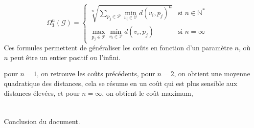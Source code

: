 \documentclass[12pt,a4paper]{article}
\begin{document}
\begin{equation*}
    \Omega_3^n(\mathcal{G}) = \begin{cases} 
        \sqrt[n]{\sum_{p_j \in \mathcal{P}} \min_{v_i \in \mathcal{V}} d(v_i, p_j)^n } & \text{si } n \in \mathbb{N}^*\\
        \max_{p_j \in \mathcal{P}} \min_{v_i \in \mathcal{V}} d(v_i, p_j) & \text{si } n = \infty
    \end{cases}
\end{equation*}
Ces formules permettent de généraliser les coûts en fonction d'un paramètre $n$,
où $n$ peut être un entier positif ou l'infini.

pour $n=1$, on retrouve les coûts précédents,
pour $n=2$, on obtient une moyenne quadratique des distances,
cela se résume en un coût qui est plus sensible aux distances élevées,
et pour $n = \infty$, on obtient le coût maximum, 

\section{}

Conclusion du document.
\end{document}
